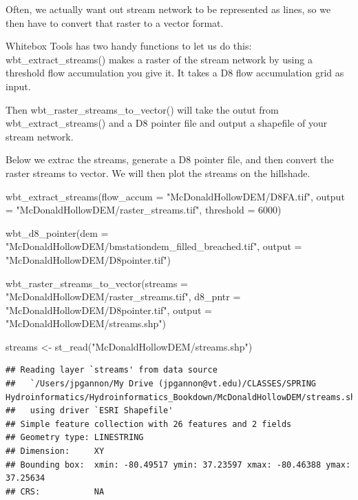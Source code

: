 \documentclass[
]{book}
\newenvironment{Shaded}{\begin{snugshade}}{\end{snugshade}}
\newcommand{\AttributeTok}[1]{\textcolor[rgb]{0.77,0.63,0.00}{#1}}
\newcommand{\DecValTok}[1]{\textcolor[rgb]{0.00,0.00,0.81}{#1}}
\newcommand{\FunctionTok}[1]{\textcolor[rgb]{0.00,0.00,0.00}{#1}}
\newcommand{\NormalTok}[1]{#1}
\newcommand{\OtherTok}[1]{\textcolor[rgb]{0.56,0.35,0.01}{#1}}
\newcommand{\StringTok}[1]{\textcolor[rgb]{0.31,0.60,0.02}{#1}}
\begin{document}
Often, we actually want out stream network to be represented as lines, so we then have to convert that raster to a vector format.

Whitebox Tools has two handy functions to let us do this: wbt\_extract\_streams() makes a raster of the stream network by using a threshold flow accumulation you give it. It takes a D8 flow accumulation grid as input.

Then wbt\_raster\_streams\_to\_vector() will take the outut from wbt\_extract\_streams() and a D8 pointer file and output a shapefile of your stream network.

Below we extrac the streams, generate a D8 pointer file, and then convert the raster streams to vector. We will then plot the streams on the hillshade.

\begin{Shaded}
\begin{Highlighting}[]
\FunctionTok{wbt\_extract\_streams}\NormalTok{(}\AttributeTok{flow\_accum =} \StringTok{"McDonaldHollowDEM/D8FA.tif"}\NormalTok{,}
                    \AttributeTok{output =} \StringTok{"McDonaldHollowDEM/raster\_streams.tif"}\NormalTok{,}
                    \AttributeTok{threshold =} \DecValTok{6000}\NormalTok{)}

\FunctionTok{wbt\_d8\_pointer}\NormalTok{(}\AttributeTok{dem =} \StringTok{"McDonaldHollowDEM/bmstationdem\_filled\_breached.tif"}\NormalTok{,}
               \AttributeTok{output =} \StringTok{"McDonaldHollowDEM/D8pointer.tif"}\NormalTok{)}

\FunctionTok{wbt\_raster\_streams\_to\_vector}\NormalTok{(}\AttributeTok{streams =} \StringTok{"McDonaldHollowDEM/raster\_streams.tif"}\NormalTok{,}
                             \AttributeTok{d8\_pntr =} \StringTok{"McDonaldHollowDEM/D8pointer.tif"}\NormalTok{,}
                             \AttributeTok{output =} \StringTok{"McDonaldHollowDEM/streams.shp"}\NormalTok{)}

\NormalTok{streams }\OtherTok{\textless{}{-}} \FunctionTok{st\_read}\NormalTok{(}\StringTok{"McDonaldHollowDEM/streams.shp"}\NormalTok{)}
\end{Highlighting}
\end{Shaded}

\begin{verbatim}
## Reading layer `streams' from data source 
##   `/Users/jpgannon/My Drive (jpgannon@vt.edu)/CLASSES/SPRING Hydroinformatics/Hydroinformatics_Bookdown/McDonaldHollowDEM/streams.shp' 
##   using driver `ESRI Shapefile'
## Simple feature collection with 26 features and 2 fields
## Geometry type: LINESTRING
## Dimension:     XY
## Bounding box:  xmin: -80.49517 ymin: 37.23597 xmax: -80.46388 ymax: 37.25634
## CRS:           NA
\end{verbatim}
\end{document}
